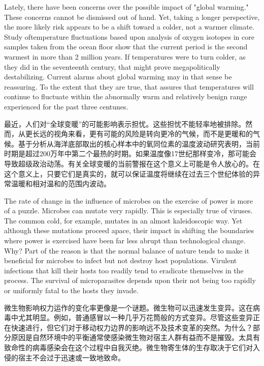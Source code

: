 \begin{Parallel}{97mm}{45mm}
  \ParallelLText
  {Lately, there have been concerns over the possible impact of "global warming." These concerns cannot be dismissed out of hand. Yet, taking a longer perspective, the more likely risk appears to be a shift toward a colder, not a warmer climate. Study oftemperature fluctuations based upon analysis of oxygen isotopes in core samples taken from the ocean floor show that the current period is the second warmest in more than 2 million years. If temperatures were to turn colder, as they did in the seventeenth century, that might prove megapolitically destabilizing. Current alarms about global warming may in that sense be reassuring. To the extent that they are true, that assures that temperatures will continue to fluctuate within the abnormally warm and relatively benign range experienced for the past three centunes.}
  
  \ParallelRText
  {最近，人们对“全球变暖”的可能影响表示担忧。这些担忧不能轻率地被排除。然而，从更长远的视角来看，更有可能的风险是转向更冷的气候，而不是更暖和的气候。基于分析从海洋底部取出的核心样本中的氧同位素的温度波动研究表明，当前时期是超过200万年中第二个最热的时期。如果温度像17世纪那样变冷，那可能会导致超级政治动荡。有关全球变暖的当前警报在这个意义上可能是令人放心的。在这个意义上，只要它们是真实的，就可以保证温度将继续在过去三个世纪体验的异常温暖和相对温和的范围内波动。}
  \ParallelPar



  \ParallelLText
  {The rate of change in the influence of microbes on the exercise of power is more of a puzzle. Microbes can mutate very rapidly. This is especially true of viruses. The common cold, for example, mutates in an almost kaleidoscopic way. Yet although these mutations proceed apace, their impact in shifting the boundaries where power is exercised have been far less abrupt than technological change. Why? Part of the reason is that the normal balance of nature tends to make it beneficial for microbes to infect but not destroy host populations. Virulent infections that kill their hosts too readily tend to eradicate themselves in the process. The survival of microparasites depends upon their not being too rapidly or uniformly fatal to the hosts they invade.}
  
  \ParallelRText
  {微生物影响权力运作的变化率更像是一个谜题。微生物可以迅速发生变异。这在病毒中尤其明显。例如，普通感冒以一种几乎万花筒般的方式变异。尽管这些变异正在快速进行，但它们对于移动权力边界的影响远不及技术变革的突然。为什么？部分原因是自然环境中的平衡通常使感染微生物对宿主人群有益而不是摧毁。太具有致命性的病毒感染会在这个过程中自我灭绝。微生物寄生体的生存取决于它们对入侵的宿主不会过于迅速或一致地致命。}
  \ParallelPar




\end{Parallel}
